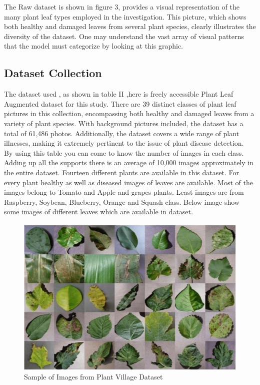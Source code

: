 \documentclass[conference]{IEEEtran}
\begin{document}
The Raw dataset is shown in figure 3, provides a visual representation of the many plant leaf types employed in the investigation. This picture, which shows both healthy and damaged leaves from several plant species, clearly illustrates the diversity of the dataset. One may understand the vast array of visual patterns that the model must categorize by looking at this graphic.

\subsection{\textbf{Dataset Collection}}
The dataset used , as shown in table II ,here is freely accessible Plant Leaf Augmented dataset for this study. There are 39 distinct classes of plant leaf pictures in this collection, encompassing both healthy and damaged leaves from a variety of plant species. With background pictures included, the dataset has a total of 61,486 photos. Additionally, the dataset covers a wide range of plant illnesses, making it extremely pertinent to the issue of plant disease detection.\\
By using this table you can come to know the number of images in each class. Adding up all the supports there is an average of 10,000 images approximately in the entire dataset. Fourteen different plants are available in this dataset. For every plant healthy as well as diseased images of leaves are available. Most of the images belong to Tomato and Apple and grapes plants. Least images are from Raspberry, Soybean, Blueberry, Orange and Squash class. Below image show some images of different leaves which are available in dataset.

\begin{figure}
    \centering
    \includegraphics[width=1.0\linewidth]{sample.jpg}
    \caption{Sample of Images from Plant Village Dataset}
    \label{fig:enter-label}
\end{figure}
\end{document}
